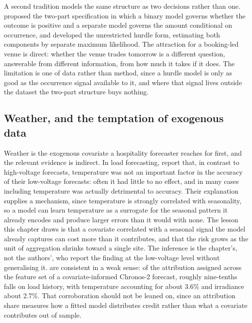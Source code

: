 A second tradition models the same structure as two decisions rather than one.
\citet{cragg_statistical_1971} proposed the two-part specification in which a
binary model governs whether the outcome is positive and a separate model governs
the amount conditional on occurrence, and \citet{mullahy_specification_1986}
developed the unrestricted hurdle form, estimating both components by separate
maximum likelihood. The attraction for a booking-led venue is direct: whether the
venue trades tomorrow is a different question, answerable from different
information, from how much it takes if it does. The limitation is one of data
rather than method, since a hurdle model is only as good as the occurrence signal
available to it, and where that signal lives outside the dataset the two-part
structure buys nothing.

\subsection{Weather, and the temptation of exogenous data}

Weather is the exogenous covariate a hospitality forecaster reaches for first,
and the relevant evidence is indirect. In load forecasting,
\citet{haben_short_2019} report that, in contrast to high-voltage forecasts,
temperature was not an important factor in the accuracy of their low-voltage
forecasts: often it had little to no effect, and in many cases including
temperature was actually detrimental to accuracy. Their explanation supplies a
mechanism, since temperature is strongly correlated with seasonality, so a model
can learn temperature as a surrogate for the seasonal pattern it already encodes
and produce larger errors than it would with none. The lesson this chapter draws
is that a covariate correlated with a seasonal signal the model already captures
can cost more than it contributes, and that the risk grows as the unit of
aggregation shrinks toward a single site. The inference is the chapter's, not the
authors', who report the finding at the low-voltage level without generalising
it. \citet{hertel_explainable_2026} are consistent in a weak sense: of the
attribution assigned across the feature set of a covariate-informed Chronos-2
forecast, roughly nine-tenths falls on load history, with temperature accounting
for about 3.6\% and irradiance about 2.7\%. That corroboration should not be
leaned on, since an attribution share measures how a fitted model distributes
credit rather than what a covariate contributes out of sample.

